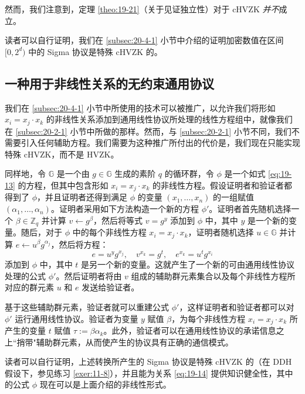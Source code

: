 然而，我们注意到，定理 \ref{theo:19-21}（关于见证独立性）对于 cHVZK \emph{并不}成立。

\begin{snote}[范围证明.]
读者可以自行证明，我们在 \ref{subsec:20-4-1} 小节中介绍的证明加密数值在区间 $[0,2^d)$ 中的 Sigma 协议是特殊 cHVZK 的。
\end{snote}

\subsection{一种用于非线性关系的无约束通用协议}\label{subsec:20-4-3}

我们在 \ref{subsec:20-4-1} 小节中所使用的技术可以被推广，以允许我们将形如 $x_i=x_j\cdot x_k$ 的非线性关系添加到通用线性协议所处理的线性方程组中，就像我们在 \ref{subsec:20-2-1} 小节中所做的那样。然而，与 \ref{subsec:20-2-1} 小节不同，我们不需要引入任何辅助方程。我们需要为这种推广所付出的代价是，我们现在只能实现特殊 cHVZK，而不是 HVZK。

同样地，令 $\mathbb G$ 是一个由 $g\in\mathbb{G}$ 生成的素阶 $q$ 的循环群，令 $\phi$ 是一个如式 \ref{eq:19-13} 的方程，但其中包含形如 $x_i=x_j\cdot x_k$ 的非线性方程。假设证明者和验证者都得到了 $\phi$，并且证明者还得到满足 $\phi$ 的变量 $(x_1,\dots,x_n)$ 的一组赋值 $(\alpha_1,\dots,\alpha_n)$。证明者采用如下方法构造一个新的方程 $\phi'$。证明者首先随机选择一个 $\beta\in\mathbb{Z}_q$ 并计算 $v\leftarrow g^\beta$，然后将等式 $v=g^y$ 添加到 $\phi$ 中，其中 $y$ 是一个新的变量。随后，对于 $\phi$ 中的每个非线性方程 $x_i=x_j\cdot x_k$，证明者随机选择 $u\in\mathbb{G}$ 并计算 $e\leftarrow u^\beta g^{\alpha_j}$，然后将方程：
\begin{equation}\label{eq:20-12}
e=u^yg^{x_j},
\quad
v^{x_k}=g^t,
\quad
e^{x_k}=u^tg^{x_i}
\end{equation}
添加到 $\phi$ 中，其中 $t$ 是另一个新的变量。这就产生了一个新的可由通用线性协议处理的公式 $\phi'$。然后证明者将由 $v$ 组成的辅助群元素集合以及每个非线性方程所对应的群元素 $u$ 和 $e$ 发送给验证者。

基于这些辅助群元素，验证者就可以重建公式 $\phi'$，这样证明者和验证者都可以对 $\phi'$ 运行通用线性协议。验证者为变量 $y$ 赋值 $\beta$，为每个非线性方程 $x_i=x_j\cdot x_k$ 所产生的变量 $t$ 赋值 $\tau:=\beta\alpha_k$。此外，验证者可以在通用线性协议的承诺信息之上``捎带"辅助群元素，从而使产生的协议具有正确的通信模式。

读者可以自行证明，上述转换所产生的 Sigma 协议是特殊 cHVZK 的（在 DDH 假设下，参见练习 \ref{exer:11-8}），并且能为关系 \ref{eq:19-14} 提供知识健全性，其中的公式 $\phi$ 现在可以是上面介绍的非线性形式。

